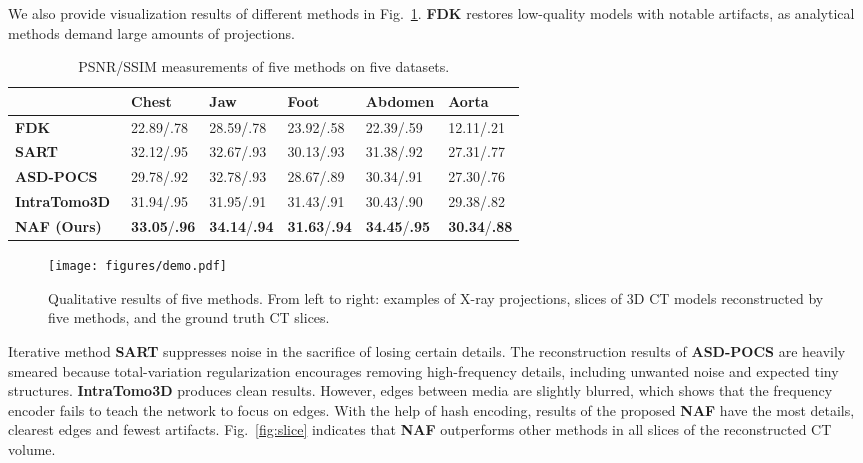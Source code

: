 \documentclass[runningheads]{llncs}
\begin{document}
We also provide visualization results of different methods in Fig.~\ref{fig:demo}. \textbf{FDK} restores low-quality models with notable artifacts, as analytical methods demand large amounts of projections.
\begin{table}[h]
\vspace{-1.5em}
\caption{PSNR/SSIM measurements of five methods on five datasets.}
\label{tab:results}
\centering
\begin{tabular}{m{}<{\centering}|m{}<{\centering}m{}<{\centering}m{}<{\centering}m{}<{\centering}m{}<{\centering}}
\toprule
            & Chest         & Jaw & Foot & Abdomen & Aorta \\ \midrule
\textbf{FDK}~\cite{feldkamp1984practical}         & 22.89/.78    & 28.59/.78   &  23.92/.58    & 22.39/.59        &  12.11/.21     \\
\textbf{SART}~\cite{andersen1984simultaneous}       & 32.12/.95    & 32.67/.93     & 30.13/.93      & 31.38/.92         &  27.31/.77     \\
\textbf{ASD-POCS}~\cite{sidky2008image}    & 29.78/.92    & 32.78/.93   &  28.67/.89       & 30.34/.91     &  27.30/.76     \\
\textbf{IntraTomo3D}~\cite{zang2021intratomo}   & 31.94/.95    & 31.95/.91  & 31.43/.91      &  30.43/.90       &  29.38/.82     \\
\textbf{NAF (Ours)} & \textbf{33.05}/\textbf{.96}    & \textbf{34.14}/\textbf{.94}     & \textbf{31.63}/\textbf{.94}     & \textbf{34.45}/\textbf{.95}        &  \textbf{30.34}/\textbf{.88}     \\ 
\bottomrule
\end{tabular}
\vspace{-3em}
\end{table}
\begin{figure}[h]
    \centering
    \texttt{[image: figures/demo.pdf]}
    \caption{Qualitative results of five methods. From left to right: examples of X-ray projections, slices of 3D CT models reconstructed by five methods, and the ground truth CT slices.}
    \label{fig:demo}
\end{figure}
Iterative method \textbf{SART} suppresses noise in the sacrifice of losing certain details. The reconstruction results of \textbf{ASD-POCS} are heavily smeared because total-variation regularization encourages removing high-frequency details, including unwanted noise and expected tiny structures. \textbf{IntraTomo3D} produces clean results. However, edges between media are slightly blurred, which shows that the frequency encoder fails to teach the network to focus on edges. With the help of hash encoding, results of the proposed \textbf{NAF} have the most details, clearest edges and fewest artifacts. Fig.~\ref{fig:slice} indicates that \textbf{NAF} outperforms other methods in all slices of the reconstructed CT volume. 
\end{document}
